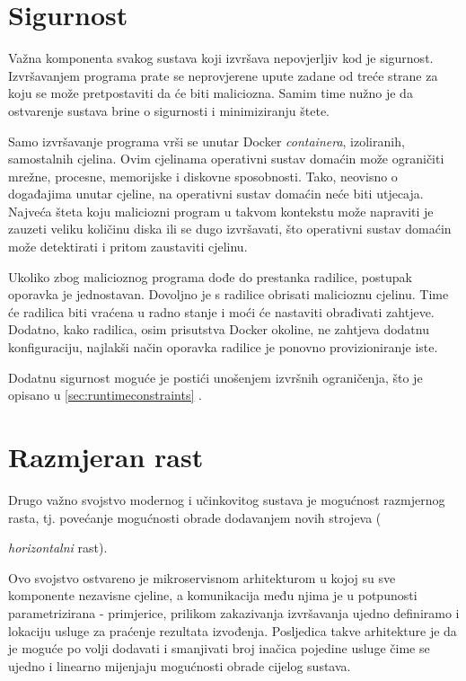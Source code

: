 \documentclass[times, utf8, zavrsni]{fer}
\begin{document}
{\section{Sigurnost}

Važna komponenta svakog sustava koji izvršava nepovjerljiv kod je sigurnost. Izvršavanjem programa prate se neprovjerene upute zadane od treće strane za koju se može pretpostaviti da će biti maliciozna. Samim time nužno je da ostvarenje sustava brine o sigurnosti i minimiziranju štete.

Samo izvršavanje programa vrši se unutar Docker {\textit{containera}}, izoliranih, samostalnih cjelina. Ovim cjelinama operativni sustav domaćin može ograničiti mrežne, procesne, memorijske i diskovne sposobnosti. Tako, neovisno o događajima unutar cjeline, na operativni sustav domaćin neće biti utjecaja. Najveća šteta koju maliciozni program u takvom kontekstu može napraviti je zauzeti veliku količinu diska ili se dugo izvršavati, što operativni sustav domaćin može detektirati i pritom zaustaviti cjelinu.

Ukoliko zbog malicioznog programa dođe do prestanka radilice, postupak oporavka je jednostavan. Dovoljno je s radilice obrisati malicioznu cjelinu. Time će radilica biti vraćena u radno stanje i moći će nastaviti obrađivati zahtjeve. Dodatno, kako radilica, osim prisutstva Docker okoline, ne zahtjeva dodatnu konfiguraciju, najlakši način oporavka radilice je ponovno provizioniranje iste.

Dodatnu sigurnost moguće je postići unošenjem izvršnih ograničenja, što je opisano u \ref{sec:runtimeconstraints} .

\section{Razmjeran rast}

Drugo važno svojstvo modernog i učinkovitog sustava je mogućnost razmjernog rasta, tj. povećanje mogućnosti obrade dodavanjem novih strojeva ({\textit{horizontalni} rast).

Ovo svojstvo ostvareno je mikroservisnom arhitekturom u kojoj su sve komponente nezavisne cjeline, a komunikacija među njima je u potpunosti parametrizirana - primjerice, prilikom zakazivanja izvršavanja ujedno definiramo i lokaciju usluge za praćenje rezultata izvođenja. Posljedica takve arhitekture je da je moguće po volji dodavati i smanjivati broj inačica pojedine usluge čime se ujedno i linearno mijenjaju mogućnosti obrade cijelog sustava.

}}
\end{document}

